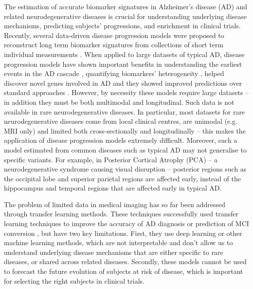 \documentclass{llncs}
\begin{document}
The estimation of accurate biomarker signatures in Alzheimer's disease (AD) and related neurodegenerative diseases is crucial for understanding underlying disease mechanisms, predicting subjects' progressions, and enrichment in clinical trials. Recently, several data-driven disease progression models were proposed to reconstruct long term biomarker signatures from collections of short term individual measurements \cite{lorenzi2017disease,oxtoby2018}. When applied to large datasets of typical AD, disease progression models have shown important benefits in understanding the earliest events in the AD cascade \cite{iturria2016early}, quantifying biomarkers' heterogeneity \cite{young2018uncovering}, helped discover novel genes involved in AD \cite{scelsi2018genetic} and they showed improved predictions over standard approaches \cite{oxtoby2018}. However, by necessity these models require large datasets -- in addition they must be both multimodal and longitudinal. Such data is not available in rare neurodegenerative diseases. In particular, most datasets for rare neurodegenerative diseases come from local clinical centres, are unimodal (e.g. MRI only) and limited both cross-sectionally and longitudinally -- this makes the application of disease progression models extremely difficult.  Moreover, such a model estimated from common diseases such as typical AD may not generalise to specific variants. For example, in Posterior Cortical Atrophy (PCA) -- a neurodegenerative syndrome causing visual disruption -- posterior regions such as the occipital lobe and superior parietal regions are affected early, instead of the hippocampus and temporal regions that are affected early in typical AD. 

The problem of limited data in medical imaging has so far been addressed through transfer learning methods. These techniques successfully used transfer learning techniques to improve the accuracy of AD diagnosis \cite{hon2017towards,cheng2017multi} or prediction of MCI conversion \cite{cheng2015domain}, but have two key limitations. First, they use deep learning or other machine learning methods, which are not interpretable and don't allow us to understand underlying disease mechanisms that are either specific to rare diseases, or shared across related diseases. Secondly, these models cannot be used to forecast the future evolution of subjects at risk of disease, which is important for selecting the right subjects in clinical trials. 
\end{document}
